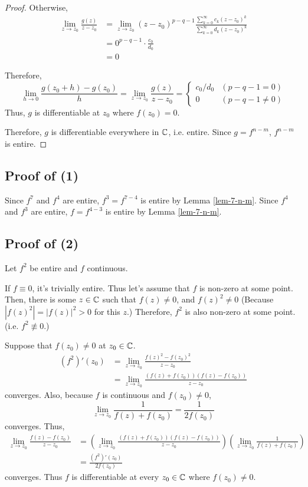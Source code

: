 \begin{proof}
  Otherwise,
  \begin{align*}
    \lim_{z \to z_0} \frac{g(z)}{z - z_0}
    &= \lim_{z \to z_0} (z - z_0)^{p - q - 1}
      \frac{\sum_{k=0}^{\infty} c_k (z - z_0)^k}
      {\sum_{k=0}^{\infty} d_k (z - z_0)^k}
    \\&= 0^{p - q - 1} \cdot \frac{c_0}{d_0}
    \\&= 0
  \end{align*}

  Therefore,
  \[\lim_{h \to 0} \frac{g(z_0 + h) - g(z_0)}{h}
  = \lim_{z \to z_0} \frac{g(z)}{z - z_0}
  = \left\{ \begin{array}{ll}
    c_0/d_0 & (p - q - 1 = 0) \\ 0 & (p - q - 1 \neq 0)
  \end{array}\right.\]
  Thus, \(g\) is differentiable at \(z_0\) where \(f(z_0) = 0\).

  Therefore, \(g\) is differentiable everywhere in \(\mathbb{C}\), i.e. entire.
  Since \(g = f^{n - m}\), \(f^{n - m}\) is entire.
\end{proof}

\subsection*{Proof of (1)}

Since \(f^7\) and \(f^4\) are entire, \(f^3 = f^{7 - 4}\) is entire by Lemma \ref{lem-7-n-m}.
Since \(f^4\) and \(f^3\) are entire, \(f = f^{4 - 3}\) is entire by Lemma \ref{lem-7-n-m}.
\qedsq

\subsection*{Proof of (2)}

Let \(f^2\) be entire and \(f\) continuous.

If \(f \equiv 0\), it's trivially entire.
Thus let's assume that \(f\) is non-zero at some point.
Then, there is some \(z \in \mathbb{C}\) such that \(f(z) \neq 0\), and \(f(z)^2 \neq 0\)
(Because \(|f(z)^2| = |f(z)|^2 > 0\) for this \(z\).)
Therefore, \(f^2\) is also non-zero at some point.
(i.e. \(f^2 \not\equiv 0\).)

Suppose that \(f(z_0) \neq 0\) at \(z_0 \in \mathbb{C}\).
\begin{align*}
  (f^2)'(z_0)
  &= \lim_{z \to z_0} \frac{f(z)^2 - f(z_0)^2}{z - z_0}
  \\&= \lim_{z \to z_0} \frac{(f(z) + f(z_0))(f(z) - f(z_0))}{z - z_0}
\end{align*}
converges.
Also, because \(f\) is continuous and \(f(z_0) \neq 0\),
\[\lim_{z \to z_0} \frac{1}{f(z) + f(z_0)} = \frac{1}{2f(z_0)}\]
converges.
Thus,
\begin{align*}
  \lim_{z \to z_0} \frac{f(z) - f(z_0)}{z - z_0}
  &= \left(\lim_{z \to z_0} \frac{(f(z) + f(z_0))(f(z) - f(z_0))}{z - z_0}\right)
    \left(\lim_{z \to z_0} \frac{1}{f(z) + f(z_0)}\right)
  \\&= \frac{(f^2)'(z_0)}{2f(z_0)}
\end{align*}
converges. Thus \(f\) is differentiable at every \(z_0 \in \mathbb{C}\) where \(f(z_0) \neq 0\).

